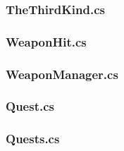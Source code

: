 \subsubsection{TheThirdKind.cs}


\subsubsection{WeaponHit.cs}


\subsubsection{WeaponManager.cs}


\subsubsection{Quest.cs}


\subsubsection{Quests.cs}



